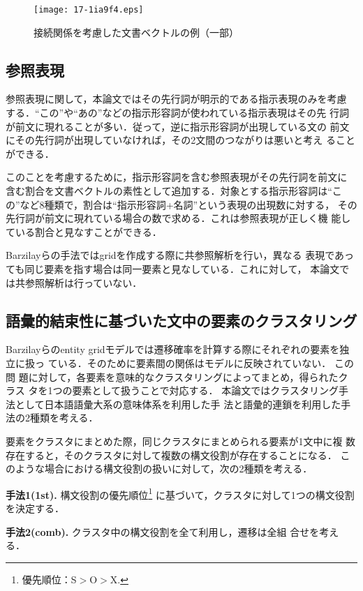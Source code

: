 \documentclass[japanese]{jnlp_1.4}
\begin{document}
 \begin{figure}[t]
   \begin{center}
\texttt{[image: 17-1ia9f4.eps]}
   \end{center}   
  \caption{接続関係を考慮した文書ベクトルの例（一部）}
\label{sample2vector}
\vspace{-0.5\baselineskip}
 \end{figure}



  \subsection{参照表現}

  参照表現に関して，本論文ではその先行詞が明示的である指示表現のみを考慮
  する．``この''や``あの''などの指示形容詞が使われている指示表現はその先
  行詞が前文に現れることが多い．従って，逆に指示形容詞が出現している文の
  前文にその先行詞が出現していなければ，その2文間のつながりは悪いと考え
  ることができる．

  このことを考慮するために，指示形容詞を含む参照表現がその先行詞を前文に
  含む割合を文書ベクトルの素性として追加する．対象とする指示形容詞は``こ
  の''など8種類で，割合は``指示形容詞+名詞''という表現の出現数に対する，
  その先行詞が前文に現れている場合の数で求める．これは参照表現が正しく機
  能している割合と見なすことができる．

  Barzilayらの手法ではgridを作成する際に共参照解析を行い，異なる
  表現であっても同じ要素を指す場合は同一要素と見なしている．これに対して，
  本論文では共参照解析は行っていない．


  \subsection{語彙的結束性に基づいた文中の要素のクラスタリング}

   Barzilayらのentity gridモデルでは遷移確率を計算する際にそれぞれの要素を独立に扱っ
   ている．そのために要素間の関係はモデルに反映されていない．
  この問
  題に対して，各要素を意味的なクラスタリングによってまとめ，得られたクラス
  タを1つの要素として扱うことで対応する．
  本論文ではクラスタリング手法として日本語語彙大系\cite{goitaikei}の意味体系を利用した手
  法と語彙的連鎖を利用した手法の2種類を考える．

  要素をクラスタにまとめた際，同じクラスタにまとめられる要素が1文中に複
  数存在すると，そのクラスタに対して複数の構文役割が存在することになる．
  このような場合における構文役割の扱いに対して，次の2種類を考える．
  \begin{list}{}{}
   \item[{\bf 手法1(1st). } ] 構文役割の優先順位\footnote{優先順位：S$>$O$>$X.}
		に基づいて，クラスタに対して1つの構文役割を決定する．
   \item[{\bf 手法2(comb). }] クラスタ中の構文役割を全て利用し，遷移は全組
		合せを考える．
  \end{list}
\end{document}
